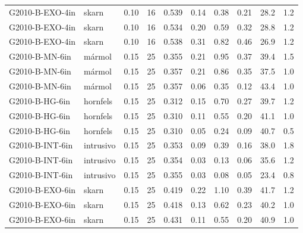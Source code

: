 \documentclass[11pt,letterpaper]{article}
\begin{document}
\begin{footnotesize}
\begin{longtable}{L{3.6cm}L{2.2cm}rrrrrrrr}
G2010-B-EXO-4in & skarn & 0.10 & 16 & 0.539 & 0.14 & 0.38 & 0.21 & 28.2 & 1.2 \\
G2010-B-EXO-4in & skarn & 0.10 & 16 & 0.534 & 0.20 & 0.59 & 0.32 & 28.8 & 1.2 \\
G2010-B-EXO-4in & skarn & 0.10 & 16 & 0.538 & 0.31 & 0.82 & 0.46 & 26.9 & 1.2 \\
G2010-B-MN-6in & mármol & 0.15 & 25 & 0.355 & 0.21 & 0.95 & 0.37 & 39.4 & 1.5 \\
G2010-B-MN-6in & mármol & 0.15 & 25 & 0.357 & 0.21 & 0.86 & 0.35 & 37.5 & 1.0 \\
G2010-B-MN-6in & mármol & 0.15 & 25 & 0.357 & 0.06 & 0.35 & 0.12 & 43.4 & 1.0 \\
G2010-B-HG-6in & hornfels & 0.15 & 25 & 0.312 & 0.15 & 0.70 & 0.27 & 39.7 & 1.2 \\
G2010-B-HG-6in & hornfels & 0.15 & 25 & 0.310 & 0.11 & 0.55 & 0.20 & 41.1 & 1.0 \\
G2010-B-HG-6in & hornfels & 0.15 & 25 & 0.310 & 0.05 & 0.24 & 0.09 & 40.7 & 0.5 \\
G2010-B-INT-6in & intrusivo & 0.15 & 25 & 0.353 & 0.09 & 0.39 & 0.16 & 38.0 & 1.8 \\
G2010-B-INT-6in & intrusivo & 0.15 & 25 & 0.354 & 0.03 & 0.13 & 0.06 & 35.6 & 1.2 \\
G2010-B-INT-6in & intrusivo & 0.15 & 25 & 0.355 & 0.03 & 0.08 & 0.05 & 23.4 & 0.8 \\
G2010-B-EXO-6in & skarn & 0.15 & 25 & 0.419 & 0.22 & 1.10 & 0.39 & 41.7 & 1.2 \\
G2010-B-EXO-6in & skarn & 0.15 & 25 & 0.418 & 0.13 & 0.62 & 0.23 & 40.2 & 1.0 \\
G2010-B-EXO-6in & skarn & 0.15 & 25 & 0.431 & 0.11 & 0.55 & 0.20 & 40.9 & 1.0 \\
\bottomrule
\end{longtable}\end{footnotesize}

\clearpage
\renewcommand{\thetable}{B\arabic{table}}\setcounter{table}{0}
\end{document}
